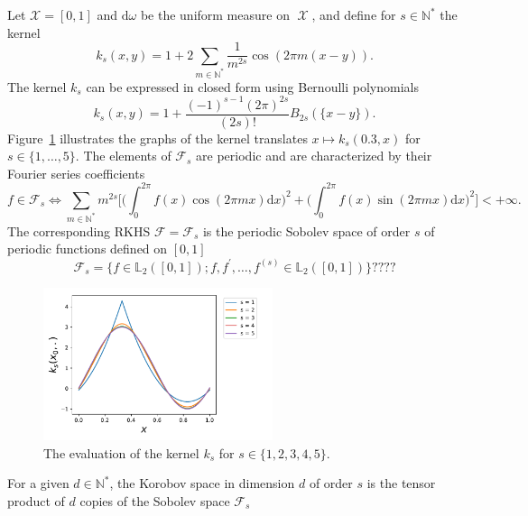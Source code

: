 \documentclass[twoside,11pt]{book}
\numberwithin{theorem}{chapter}
\numberwithin{definition}{chapter}
\numberwithin{proposition}{chapter}
\numberwithin{corollary}{chapter}
\numberwithin{example}{chapter}
\numberwithin{lemma}{chapter}
\numberwithin{assumption}{chapter}
\DeclareMathOperator{\X}{\mathcal{X}}
\begin{document}
Let $\mathcal{X} = [0,1]$ and $\mathrm{d}\omega$ be the uniform measure on $\X$, and define for $s \in \mathbb{N}^{*}$ the kernel
\begin{equation}
k_{s}(x,y) = 1+ 2\sum\limits_{m \in \mathbb{N}^{*}} \frac{1}{m^{2s}} \cos(2\pi m(x-y)).
\end{equation}
The kernel $k_{s}$ can be expressed in closed form using Bernoulli polynomials \cite{Wah90}
\begin{equation}
k_{s}(x,y) = 1 + \frac{(-1)^{s-1}(2 \pi)^{2s}}{(2s)!} B_{2s}(\{x-y\}).
\end{equation}
Figure~\ref{fig:periodic_sobolev_kernel} illustrates the graphs of the kernel translates $x \mapsto k_{s}(0.3,x)$ for $s \in \{1, \dots, 5\}$. The elements of $\mathcal{F}_{s}$ are periodic and are characterized by their Fourier series coefficients
\begin{equation}
f \in \mathcal{F}_{s} \iff \sum\limits_{m \in \mathbb{N}^{*}} m^{2s} \bigg[\big( \int_{0}^{2\pi} f(x)\cos (2 \pi m x) \mathrm{d}x \big)^{2} + \big( \int_{0}^{2\pi} f(x)\sin (2 \pi m x) \mathrm{d}x \big)^{2} \bigg] <+\infty .
\end{equation}
The corresponding RKHS $\mathcal{F}=\mathcal{F}_{s}$ is the periodic Sobolev space of order $s$ of periodic functions defined on $[0,1]$ \citep{BeTh11}
\begin{equation}
\mathcal{F}_{s} = \{f \in \mathbb{L}_{2}([0,1]); f,f^{'}, \dots, f^{(s)} \in \mathbb{L}_{2}([0,1]) \}????
\end{equation}
\begin{figure}[]
    \centering
\includegraphics[width= 0.6\textwidth]{img/Sobolev/Bernoulli_kernels_same_node_s_1_5.pdf}
\caption{The evaluation of the kernel $k_{s}$ for $s \in \{1,2,3,4,5\}$.
\label{fig:periodic_sobolev_kernel}}
\end{figure}
For a given $d \in \mathbb{N}^{*}$, the Korobov space in dimension $d$ of order $s$  is the tensor product of $d$ copies of the Sobolev space $\mathcal{F}_{s}$
\end{document}
